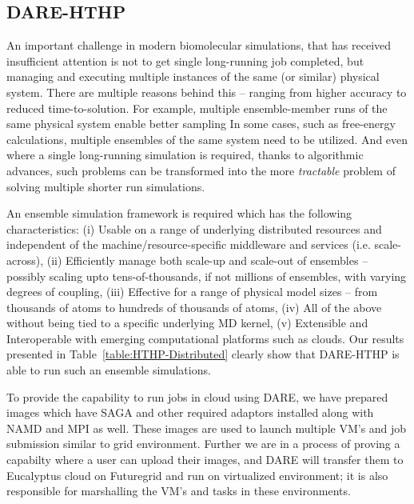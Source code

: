 \documentclass{sig-alternate}
\begin{document}
\subsection{DARE-HTHP}

An important challenge in modern biomolecular simulations, that has
received insufficient attention is not to get single long-running job
completed, but managing and executing multiple instances of the same
(or similar) physical system.  There are multiple reasons behind this
-- ranging from higher accuracy to reduced time-to-solution. For
example, multiple ensemble-member runs of the same physical system
enable better sampling In some cases, such as free-energy
calculations, multiple ensembles of the same system need to be
utilized. And even where a single long-running simulation is required,
thanks to algorithmic advances, such problems can be transformed into
the more {\it tractable} problem of solving multiple shorter run
simulations.



An ensemble simulation framework is required which has the following
characteristics: (i) Usable on a range of underlying distributed
resources and independent of the machine/resource-specific middleware
and services (i.e. scale-across), (ii) Efficiently manage both
scale-up and scale-out of ensembles -- possibly scaling upto
tens-of-thousands, if not millions of ensembles, with varying degrees
of coupling, (iii) Effective for a range of physical model sizes --
from thousands of atoms to hundreds of thousands of atoms, (iv) All of
the above without being tied to a specific underlying MD kernel, (v)
Extensible and Interoperable with emerging computational platforms
such as clouds.  Our results presented in
Table~\ref{table:HTHP-Distributed} clearly show that  DARE-HTHP is
able to run such an ensemble simulations.



To provide the capability to run jobs in cloud using DARE, we have
prepared images which have SAGA and other required adaptors installed
along with NAMD and MPI as well.  These images are used to launch
multiple VM's and job submission similar to grid environment. Further
we are in a process of proving a capabilty where a user can upload
their images, and DARE will transfer them to Eucalyptus cloud on
Futuregrid and run on virtualized environment; it is also responsible
for marshalling the VM's and tasks in these environments.
\end{document}
